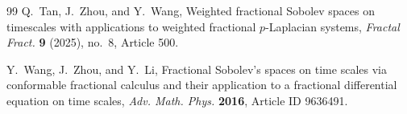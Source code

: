 \documentclass[11pt,a4paper]{article}
\numberwithin{equation}{section}
\theoremstyle{definition}
\begin{document}
\begin{thebibliography}{99}
Q.~Tan, J.~Zhou, and Y.~Wang,
Weighted fractional Sobolev spaces on timescales with applications to weighted fractional $p$-Laplacian systems,
\emph{Fractal Fract.} \textbf{9} (2025), no.~8, Article 500.

Y.~Wang, J.~Zhou, and Y.~Li,
Fractional Sobolev's spaces on time scales via conformable fractional calculus and their application to a fractional differential equation on time scales,
\emph{Adv. Math. Phys.} \textbf{2016}, Article ID 9636491.

\end{thebibliography}

\end{document}
